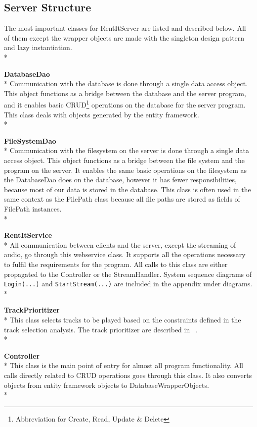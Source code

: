 \documentclass[a4paper,11pt,report]{article}
\begin{document}
\subsection{Server Structure}
The most important classes for RentItServer are listed and described below. All of them except the wrapper objects are made with the singleton design pattern and lazy instantiation.\\*

\textbf{DatabaseDao} \\*
Communication with the database is done through a single data access object. This object functions as a bridge between the database and the server program, and it enables basic CRUD\footnote{Abbreviation for Create, Read, Update \& Delete} operations on the database for the server program. This class deals with objects generated by the entity framework. \\*

\textbf{FileSystemDao} \\*
Communication with the filesystem on the server is done through a single data access object. This object functions as a bridge between the file system and the program on the server. It enables the same basic operations on the filesystem as the DatabaseDao does on the database, however it has fewer responsibilities, because most of our data is stored in the database. This class is often used in the same context as the FilePath class because all file paths are stored as fields of FilePath instances. \\*

\textbf{RentItService} \\*
All communication between clients and the server, except the streaming of audio, go through this webservice class. It supports all the operations necessary to fulfil the requirements for the program. All calls to this class are either propagated to the Controller or the StreamHandler. System sequence diagrams of \texttt{Login(...)} and \texttt{StartStream(...)} are included in the appendix under diagrams. \\*

\textbf{TrackPrioritizer} \\*
This class selects tracks to be played based on the constraints defined in the track selection analysis. The track prioritizer are described in ~. \\*

\textbf{Controller} \\*
This class is the main point of entry for almost all program functionality. All calls directly related to CRUD operations goes through this class. It also converts objects from entity framework objects to DatabaseWrapperObjects.\\*
\end{document}
